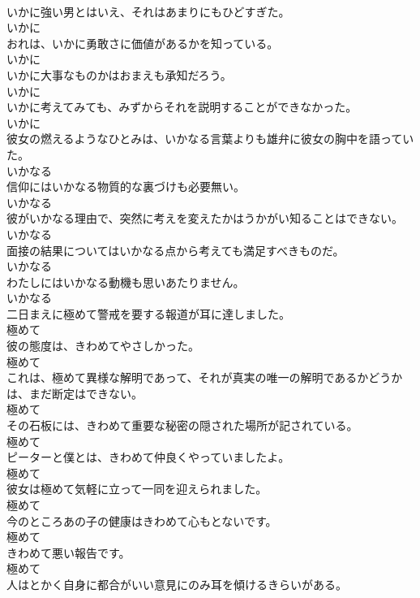 \documentclass[8pt]{extreport}
\begin{document}
\begin{CJK}{UTF8}{min}
\\	いかに強い男とはいえ、それはあまりにもひどすぎた。	
\\	いかに
\\	おれは、いかに勇敢さに価値があるかを知っている。	
\\	いかに
\\	いかに大事なものかはおまえも承知だろう。	
\\	いかに
\\	いかに考えてみても、みずからそれを説明することができなかった。	
\\	いかに
\\	彼女の燃えるようなひとみは、いかなる言葉よりも雄弁に彼女の胸中を語っていた。	
\\	いかなる
\\	信仰にはいかなる物質的な裏づけも必要無い。	
\\	いかなる
\\	彼がいかなる理由で、突然に考えを変えたかはうかがい知ることはできない。	
\\	いかなる
\\	面接の結果についてはいかなる点から考えても満足すべきものだ。	
\\	いかなる
\\	わたしにはいかなる動機も思いあたりません。	
\\	いかなる
\\	二日まえに極めて警戒を要する報道が耳に達しました。	
\\	極めて
\\	彼の態度は、きわめてやさしかった。	
\\	極めて
\\	これは、極めて異様な解明であって、それが真実の唯一の解明であるかどうかは、まだ断定はできない。	
\\	極めて
\\	その石板には、きわめて重要な秘密の隠された場所が記されている。	
\\	極めて
\\	ピーターと僕とは、きわめて仲良くやっていましたよ。	
\\	極めて
\\	彼女は極めて気軽に立って一同を迎えられました。	
\\	極めて
\\	今のところあの子の健康はきわめて心もとないです。	
\\	極めて
\\	きわめて悪い報告です。	
\\	極めて
\\	人はとかく自身に都合がいい意見にのみ耳を傾けるきらいがある。	

\end{CJK}
\end{document}
